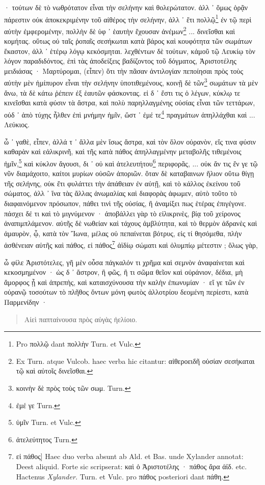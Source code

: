 \documentclass[a4paper, 11pt, oneside, polutonikogreek, german]{article}
\begin{document}
· τούτων δὲ τὸ νωθρότατον εἶναι τὴν σελήνην καὶ θολερώτατον. ἀλλ ᾽ ὅμως ὁρᾷν πάρεστιν οὐκ ἀποκεκριμένην τοῦ αἰθέρος τὴν σελήνην, ἀλλ ᾽ ἔτι πολλῷ\footnote{Pro πολλῷ dant πολλὴν Turn. et Vulc.} ἐν τῷ περὶ αὐτὴν ἐμφερομένην, πολλὴν δὲ ὑφ ᾽ ἑαυτὴν ἔχουσαν ἀνέμων\footnote{Ex Turn. atque Vulcob. haec verba hic citantur: αἰθεροειδῆ οὐσίαν σεσήκαται τῷ καὶ αὐτοῖς δινεῖσθαι.} ... δινεῖσθαι καὶ κομήτας. οὕτως οὐ ταῖς ῥοπαῖς σεσήκωται κατὰ βάρος καὶ κουφότητα τῶν σωμάτων ἕκαστον, ἀλλ ᾽ ἑτέρῳ λόγῳ κεκόσμηται. λεχθέντων δὲ τούτων, κἀμοῦ τῷ Λευκίῳ τὸν λόγον παραδιδόντος, ἐπὶ τὰς ἀποδείξεις βαδίζοντος τοῦ δόγματος, Ἀριστοτέλης μειδιάσας · Μαρτύρομαι, (εἶπεν) ὅτι τὴν πᾶσαν ἀντιλογίαν πεποίησαι πρὸς τοὺς αὐτὴν μὲν ἡμίπυρον εἶναι τὴν σελήνην ὑποτιθεμένους, κοινῇ δὲ τῶν\footnote{κοινὴν δὲ πρὸς τοὺς τῶν σωμ. Turn.} σωμάτων τὰ μὲν ἄνω, τὰ δὲ κάτω ῥέπειν ἐξ ἑαυτῶν φάσκοντας. εἰ δ ᾽ ἔστι τις ὁ λέγων, κύκλῳ τε κινεῖσθαι κατὰ φύσιν τὰ ἄστρα, καὶ πολὺ παρηλλαγμένης οὐσίας εἶναι τῶν τεττάρων, οὐδ ᾽ ἀπὸ τύχης ἦλθεν ἐπὶ μνήμην ἡμῖν, ὥστ ᾽ ἐμέ τε\footnote{ἐμέ γε Turn.} πραγμάτων ἀπηλλάχθαι καὶ ... Λεύκιος.

ὦ ᾽ γαθὲ, εἶπεν, ἀλλά τ ᾽ ἄλλα μὲν ἴσως ἄστρα, καὶ τὸν ὅλον οὐρανὸν, εἴς τινα φύσιν καθαρὰν καὶ εἀλικρινῆ, καὶ τῆς κατὰ πάθος ἀπηλλαγμένην μεταβολῆς τιθεμένοις ἡμῖν,\footnote{ὑμῖν Turn. et Vulc.} καὶ κύκλον ἄγουσι, δι ᾽ οὐ καὶ ἀτελευτήτου\footnote{ἀτελεύτητος Turn.} περιφορᾶς, ... οὐκ ἄν τις ἔν γε τῷ νῦν διαμάχοιτο, καίτοι μυρίων οὐσῶν ἀποριῶν. ὅταν δὲ καταβαινων ἥλιον οὕτω θίγῃ τῆς σελήνης, οὐκ ἔτι φυλάττει τὴν ἀπάθειαν ἐν αὐτῇ, καὶ τὸ κάλλος ἐκείνου τοῦ σώματος, ἀλλ ᾽ ἵνα τὰς ἄλλας ἀνωμαλίας καὶ διαφορὰς ἀφωμεν, αὐτὸ τοῦτο τὸ διαφαινόμενον πρόσωπον, πάθει τινὶ τῆς οὐσίας, ἢ ἀναμίξει πως ἑτέρας ἐπιγέγονε. πάσχει δέ τι καὶ τὸ μιγνύμενον · ἀποβάλλει γὰρ τὸ εἰλικρινὲς, βίᾳ τοῦ χείρονος ἀναπιμπλάμενον. αὐτῆς δὲ νωθείαν καὶ τάχους ἀμβλύτητα, καὶ τὸ θερμὸν ἀδρανὲς καὶ ἀμαυρὸν, ᾧ, κατὰ τὸν Ἴωνα, μέλας οὐ πεπαίνεται βότρυς, εἰς τί θησόμεθα, πλὴν ἀσθένειαν αὐτῆς καὶ πάθος, εἰ πάθος\footnote{εἰ πάθος] Haec duo verba absunt ab Ald. et Bas. unde Xylander annotat: Deest aliquid. Forte sic scripserat: καὶ ὁ Ἀριστοτέλης · πάθος ἄρα ἀϊδ. etc. Hactenus \emph{Xylander.} Turn. et Vulc. pro πάθος posteriori dant πάθη.} ἀϊδίῳ σώματι καὶ ὀλυμπίῳ μέτεστιν ; ὅλως γὰρ,

ὦ φίλε Ἀριστότελες, γῆ μὲν οὖσα πάγκαλόν τι χρῆμα καὶ σεμνὸν ἀναφαίνεται καὶ κεκοσμημένον · ὡς δ ᾽ ἄστρον, ἢ φῶς, ἢ τι σῶμα θεῖον καὶ οὐράνιον, δέδια, μὴ ἄμορφος ᾖ καὶ ἀπρεπὴς, καὶ καταισχύνουσα τὴν καλὴν ἐπωνυμίαν · εἴ γε τῶν ἐν οὐρανῷ τοσούτων τὸ πλῆθος ὄντων μόνη φωτὸς ἀλλοτρίου δεομένη περίεστι, κατὰ Παρμενίδην ·
\begin{quotation}
Αἰεὶ παπταίνουσα πρὸς αὐγὰς ἠελίοιο.
\end{quotation}
\end{document}
